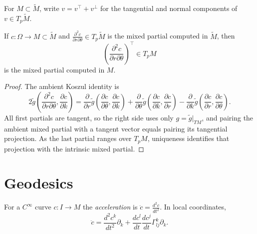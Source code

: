 For $M\subset\tilde M$, write $v=v^\top+v^\perp$ for the tangential and normal
components of $v\in T_p\tilde M$.

\begin{proposition}
  \label{prop:pet-ch5-mixed-partials-submanifold}


  If $c:\Omega\to M\subset\tilde M$ and $\frac{\partial^2c}{\partial r\partial\theta}\in T_p\tilde M$
  is the mixed partial computed in $\tilde M$, then
  \[
    \left(\frac{\partial^2c}{\partial r\partial\theta}\right)^\top\in T_pM
  \]
  is the mixed partial computed in $M$.
\end{proposition}
\begin{proof}

  \sketch
  The ambient Koszul identity is
  \[
    2\tilde g\!\left(\frac{\partial^2c}{\partial r\partial\theta},\frac{\partial c}{\partial k}\right)
    =\frac{\partial}{\partial r}\tilde g\!\left(\frac{\partial c}{\partial\theta},\frac{\partial c}{\partial k}\right)
    +\frac{\partial}{\partial\theta}\tilde g\!\left(\frac{\partial c}{\partial k},\frac{\partial c}{\partial r}\right)
    -\frac{\partial}{\partial k}\tilde g\!\left(\frac{\partial c}{\partial r},\frac{\partial c}{\partial\theta}\right).
  \]
  All first partials are tangent, so the right side uses only
  $g=\tilde g|_{TM}$, and pairing the ambient mixed partial with a tangent vector
  equals pairing its tangential projection.  As the last partial ranges over
  $T_pM$, uniqueness identifies that projection with the intrinsic mixed partial.
\end{proof}

\section{Geodesics}

\begin{definition}
  \label{def:pet-ch5-acceleration}


  For a $C^\infty$ curve $c:I\to M$ the \emph{acceleration} is $\ddot c=\frac{d^2c}{dt^2}$.
  In local coordinates,
  \[
    \ddot c=\frac{d^2c^k}{dt^2}\partial_k+\frac{dc^l}{dt}\frac{dc^j}{dt}\Gamma^k_{lj}\partial_k.
  \]
\end{definition}

